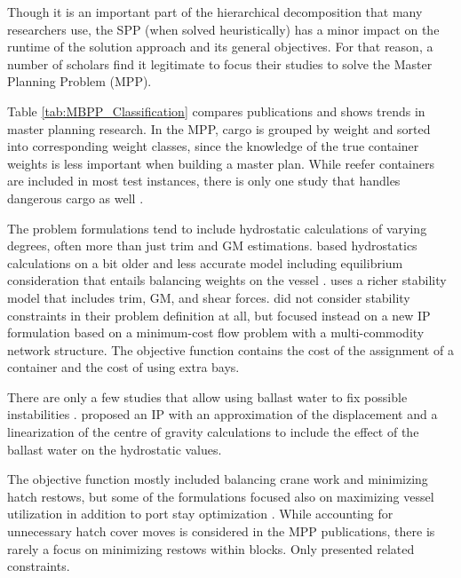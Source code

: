 \documentclass[preprint,12pt,authoryear]{elsarticle}
\begin{document}
Though it is an important part of the hierarchical decomposition that many researchers use, the SPP (when solved heuristically) has a minor impact on the runtime of the solution approach and its general objectives. For that reason, a number of scholars find it legitimate to focus their studies to solve the Master Planning Problem (MPP).

Table \ref{tab:MBPP_Classification} compares publications and shows trends in master planning research. In the MPP, cargo is grouped by weight and sorted into corresponding weight classes, since the knowledge of the true container weights is less important when building a master plan. While reefer containers are included in most test instances, there is only one study that handles dangerous cargo as well \citep{Kebedow2018IncludingProblem}. 

The problem formulations tend to include hydrostatic calculations of varying degrees, often more than just trim and GM estimations. \cite{Ambrosino2015ExperimentalProblem, Ambrosino2015APlanning, Ambrosino2015ComputationalProblems} based hydrostatics calculations on a bit older and less accurate model including equilibrium consideration that entails balancing weights on the vessel \citep{Ambrosino2004StowingProblem}. \cite{Ambrosino2018ShippingApproach} uses a richer stability model that includes trim, GM, and shear forces. \cite{Chao2021} did not consider stability constraints in their problem definition at all, but focused instead on a new IP formulation based on a minimum-cost flow problem with a multi-commodity network structure. The objective function contains the cost of the assignment of a container and the cost of using extra bays.

There are only a few studies that allow using ballast water to fix possible instabilities \citep{Pacino2012AnTanks, Bilican2020AParameters}. \cite{Pacino2012AnTanks} proposed an IP with an approximation of the displacement and a linearization of the centre of gravity calculations to include the effect of the ballast water on the hydrostatic values. 

The objective function mostly included balancing crane work and minimizing hatch restows, but some of the formulations focused also on maximizing vessel utilization in addition to port stay optimization \citep{Ambrosino2015ExperimentalProblem, Kebedow2018IncludingProblem, Chao2021}. While accounting for unnecessary hatch cover moves is considered in the MPP publications, there is rarely a focus on minimizing restows within blocks. Only \cite{Bilican2020AParameters, Pacino2013AnPlanning} presented related constraints.
\end{document}
